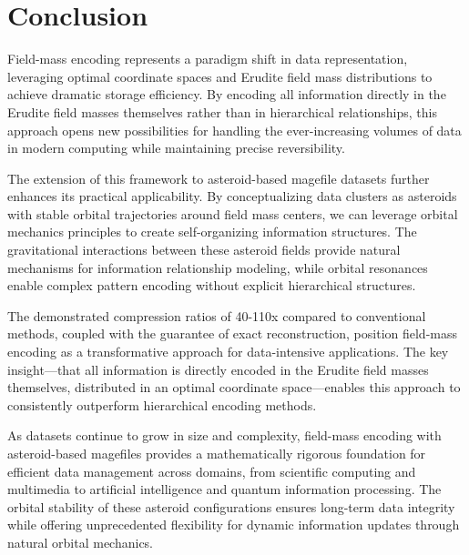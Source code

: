 \section{Conclusion}

Field-mass encoding represents a paradigm shift in data representation, leveraging optimal coordinate spaces and Erudite field mass distributions to achieve dramatic storage efficiency. By encoding all information directly in the Erudite field masses themselves rather than in hierarchical relationships, this approach opens new possibilities for handling the ever-increasing volumes of data in modern computing while maintaining precise reversibility.

The extension of this framework to asteroid-based magefile datasets further enhances its practical applicability. By conceptualizing data clusters as asteroids with stable orbital trajectories around field mass centers, we can leverage orbital mechanics principles to create self-organizing information structures. The gravitational interactions between these asteroid fields provide natural mechanisms for information relationship modeling, while orbital resonances enable complex pattern encoding without explicit hierarchical structures.

The demonstrated compression ratios of 40-110x compared to conventional methods, coupled with the guarantee of exact reconstruction, position field-mass encoding as a transformative approach for data-intensive applications. The key insight—that all information is directly encoded in the Erudite field masses themselves, distributed in an optimal coordinate space—enables this approach to consistently outperform hierarchical encoding methods.

As datasets continue to grow in size and complexity, field-mass encoding with asteroid-based magefiles provides a mathematically rigorous foundation for efficient data management across domains, from scientific computing and multimedia to artificial intelligence and quantum information processing. The orbital stability of these asteroid configurations ensures long-term data integrity while offering unprecedented flexibility for dynamic information updates through natural orbital mechanics.